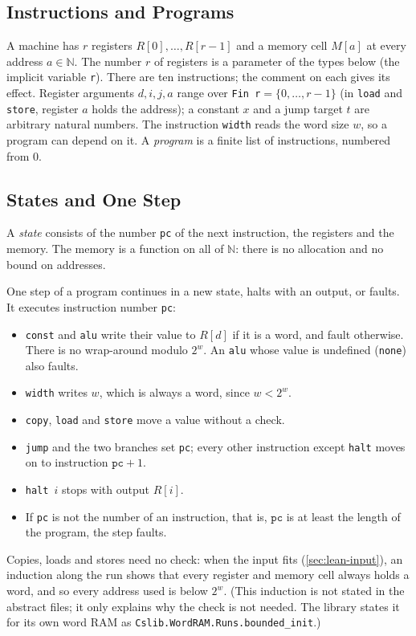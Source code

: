 \documentclass[11pt]{article}
\newcommand{\leanitem}[1]{\leansep\def\leansep{\vspace{2pt}}}
\newcommand{\leansnippet}[1]{\begin{leanbox}\def\leansep{}\let\do\leanitem\docsvlist{#1}\end{leanbox}}
\newcommand{\N}{\mathbb N}
\newcommand{\lean}[1]{\texttt{#1}}
\begin{document}
\subsection{Instructions and Programs}

A machine has $r$ registers $R[0],\dots,R[r-1]$ and a memory cell $M[a]$ at every address
$a\in\N$.
The number $r$ of registers is a parameter of the types below (the implicit variable
\lean{r}).
There are ten instructions; the comment on each gives its effect.
Register arguments $d,i,j,a$ range over \lean{Fin r}${}=\{0,\dots,r-1\}$ (in \lean{load}
and \lean{store}, register $a$ holds the address); a constant $x$ and a jump target $t$ are
arbitrary natural numbers.
The instruction \lean{width} reads the word size $w$, so a program can depend on it.
A \emph{program} is a finite list of instructions, numbered from $0$.

\leansnippet{variable,Instr,Program}

\subsection{States and One Step}\label{sec:lean-step}

A \emph{state} consists of the number \lean{pc} of the next instruction, the registers and
the memory.
The memory is a function on all of $\N$: there is no allocation and no bound on addresses.

One step of a program continues in a new state, halts with an output, or faults.
It executes instruction number \lean{pc}:
\begin{itemize}
  \item \lean{const} and \lean{alu} write their value to $R[d]$ if it is a word, and fault
    otherwise. There is no wrap-around modulo $2^w$. An \lean{alu} whose value is undefined
    (\lean{none}) also faults.
  \item \lean{width} writes $w$, which is always a word, since $w<2^w$.
  \item \lean{copy}, \lean{load} and \lean{store} move a value without a check.
  \item \lean{jump} and the two branches set \lean{pc}; every other instruction except
    \lean{halt} moves on to instruction $\lean{pc}+1$.
  \item \lean{halt}~$i$ stops with output $R[i]$.
  \item If \lean{pc} is not the number of an instruction, that is, $\lean{pc}$ is at least
    the length of the program, the step faults.
\end{itemize}
Copies, loads and stores need no check: when the input fits (\cref{sec:lean-input}), an
induction along the run shows that every register and memory cell always holds a word, and
so every address used is below $2^w$.
(This induction is not stated in the abstract files; it only explains why the check is not
needed. The library states it for its own word RAM as \lean{Cslib.WordRAM.Runs.bounded\_init}.)
\end{document}
